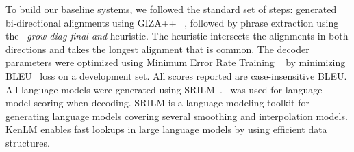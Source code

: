 To build our baseline systems, we followed the standard set of steps: generated bi-directional alignments using GIZA++ ~\cite{OchNey:03}, followed by phrase extraction using the \emph{--grow-diag-final-and} heuristic. The heuristic intersects the alignments in both directions and takes the longest alignment that is common. The decoder parameters were optimized using Minimum Error Rate Training ~\cite{Och:03} by minimizing BLEU~\cite{Papineni:02} loss on a development set. All scores reported are case-insensitive BLEU. All language models were generated using SRILM~\cite{Stolcke:02}.~\cite{Ken:11} was used for language model scoring when decoding. SRILM is a language modeling toolkit for generating language models covering several smoothing and interpolation models. KenLM enables fast lookups in large language models by using efficient data structures.  